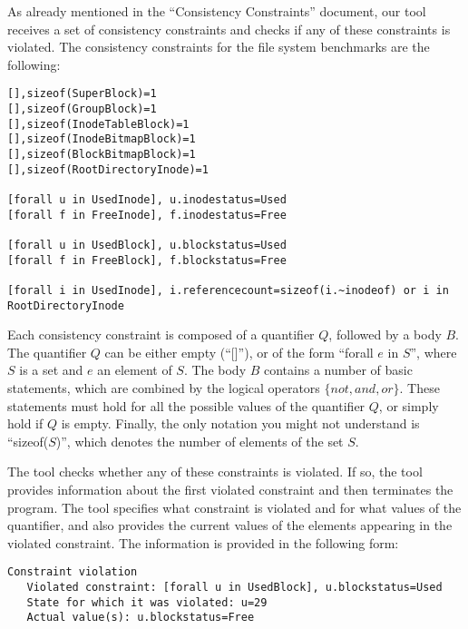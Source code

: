 \documentclass{article}
\title{}
\author{Debugging experiment - The Tool}
\date{July 30, 2003}
\begin{document}
\maketitle
\begin{flushleft}

\thispagestyle{empty}

\vspace{0.5in}

As already mentioned in the ``Consistency Constraints'' document, our tool 
receives a set of consistency constraints and checks if any of these 
constraints is violated.  The consistency constraints for the file system
benchmarks are the following:

\begin{verbatim}
[],sizeof(SuperBlock)=1
[],sizeof(GroupBlock)=1
[],sizeof(InodeTableBlock)=1
[],sizeof(InodeBitmapBlock)=1
[],sizeof(BlockBitmapBlock)=1
[],sizeof(RootDirectoryInode)=1

[forall u in UsedInode], u.inodestatus=Used
[forall f in FreeInode], f.inodestatus=Free

[forall u in UsedBlock], u.blockstatus=Used
[forall f in FreeBlock], f.blockstatus=Free

[forall i in UsedInode], i.referencecount=sizeof(i.~inodeof) or i in RootDirectoryInode
\end{verbatim}

Each consistency constraint is composed of a quantifier $Q$, followed by a 
body $B$.  The quantifier $Q$ can be either empty (``[]''), or of the form 
``forall $e$ in $S$'', where $S$ is a set and $e$ an element of $S$.
The body $B$ contains a number of basic statements, which are combined by
the logical operators $\{not, and, or\}$.  These statements must hold for  
all the possible values of the quantifier $Q$, or simply hold if $Q$ 
is empty.  Finally, the only notation you might not understand is 
``sizeof($S$)'', which denotes the number of elements of the set $S$.

\vspace{0.1in}

The tool checks whether any of these constraints is violated.  If so, the tool 
provides information about the first violated constraint and then terminates 
the program.  The tool specifies what constraint is violated and for what 
values of the quantifier, and also provides the current values of the elements 
appearing in the violated constraint.
The information is provided in the following form:

\begin{verbatim}
Constraint violation
   Violated constraint: [forall u in UsedBlock], u.blockstatus=Used
   State for which it was violated: u=29
   Actual value(s): u.blockstatus=Free
\end{verbatim}


\end{flushleft}
\end{document}
